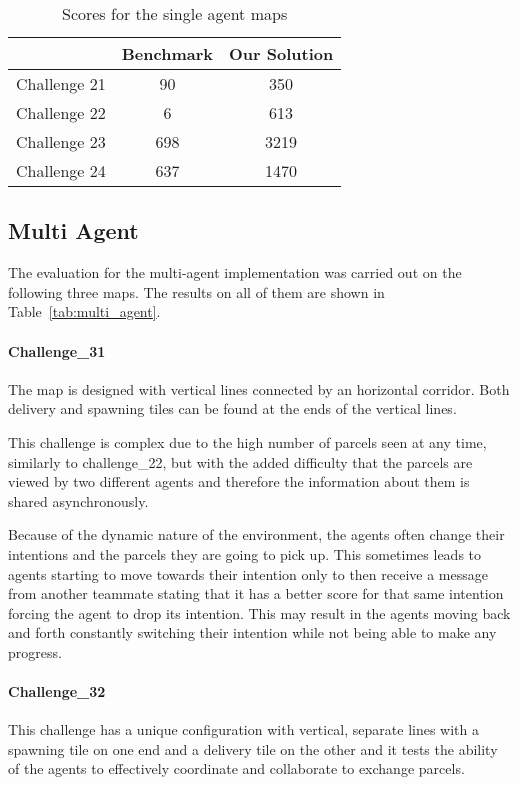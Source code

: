 \begin{table}
    \centering
    \begin{tabular}{c || c c} \hline
                    & Benchmark  & Our Solution   \\ \hline
    Challenge 21    &  90       &  350          \\
    Challenge 22    &  6        &  613          \\
    Challenge 23    &  698      &  3219         \\
    Challenge 24    &  637      &  1470         \\  \hline 
    \end{tabular}
    \caption{Scores for the single agent maps}
    \label{tab:single_agent}
\end{table}


\subsection{Multi Agent}
The evaluation for the multi-agent implementation was carried out on the following three maps. The results on all of them are shown in Table~\ref{tab:multi_agent}.


\paragraph{Challenge\_31} The map is designed with vertical lines connected by an horizontal corridor. Both delivery and spawning tiles can be found at the ends of the vertical lines.

This challenge is complex due to the high number of parcels seen at any time, similarly to challenge\_22, but with the added difficulty that the parcels are viewed by two different agents and therefore the information about them is shared asynchronously. 

Because of the dynamic nature of the environment, the agents often change their intentions and the parcels they are going to pick up. This sometimes leads to agents starting to move towards their intention only to then receive a message from another teammate stating that it has a better score for that same intention forcing the agent to drop its intention. This may result in the agents moving back and forth constantly switching their intention while not being able to make any progress. 

\paragraph{Challenge\_32}  This challenge has a unique configuration with vertical, separate lines with a spawning tile on one end and a delivery tile on the other and it tests the ability of the agents to effectively coordinate and collaborate to exchange parcels.

